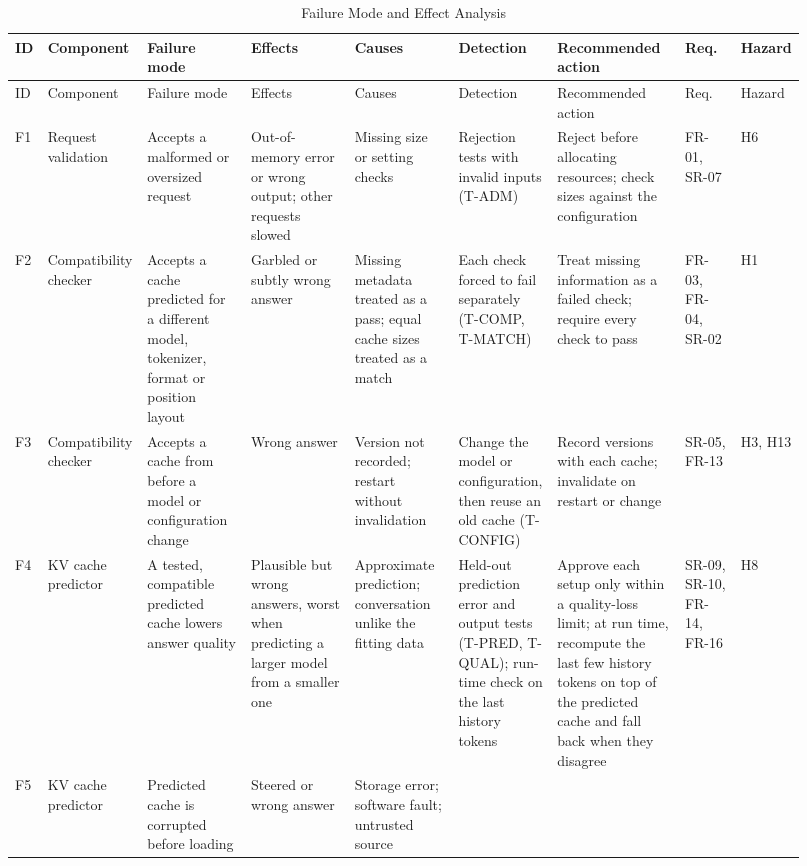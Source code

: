 \documentclass{article}
\begin{document}
\begin{landscape}
\footnotesize
\setlength{\tabcolsep}{3pt}
\begin{longtable}{@{}p{0.04\linewidth}p{0.10\linewidth}p{0.13\linewidth}%
p{0.13\linewidth}p{0.13\linewidth}p{0.11\linewidth}p{0.16\linewidth}%
p{0.07\linewidth}p{0.05\linewidth}@{}}
\caption{Failure Mode and Effect Analysis}\label{tab:fmea}\\
\toprule
ID & Component & Failure mode & Effects & Causes & Detection &
Recommended action & Req. & Hazard\\
\midrule\endfirsthead
\toprule
ID & Component & Failure mode & Effects & Causes & Detection &
Recommended action & Req. & Hazard\\
\midrule\endhead
F1 & Request validation & Accepts a malformed or oversized request &
Out-of-memory error or wrong output; other requests slowed & Missing size
or setting checks & Rejection tests with invalid inputs (T-ADM) & Reject
before allocating resources; check sizes against the configuration & FR-01,
SR-07 & H6\\
F2 & Compatibility checker & Accepts a cache predicted for a different
model, tokenizer, format or position layout & Garbled or subtly wrong
answer & Missing metadata treated as a pass; equal cache sizes treated as a
match & Each check forced to fail separately (T-COMP, T-MATCH) & Treat
missing information as a failed check; require every check to pass & FR-03,
FR-04, SR-02 & H1\\
F3 & Compatibility checker & Accepts a cache from before a model or
configuration change & Wrong answer & Version not recorded; restart without
invalidation & Change the model or configuration, then reuse an old cache
(T-CONFIG) & Record versions with each cache; invalidate on restart or
change & SR-05, FR-13 & H3, H13\\
F4 & KV cache predictor & A tested, compatible predicted cache lowers
answer quality & Plausible but wrong answers, worst when predicting a
larger model from a smaller one & Approximate prediction; conversation
unlike the fitting data & Held-out prediction error and output tests
(T-PRED, T-QUAL); run-time check on the last history tokens & Approve
each setup only within a quality-loss limit; at run time, recompute the
last few history tokens on top of the predicted cache and fall back when
they disagree & SR-09, SR-10, FR-14, FR-16 & H8\\
F5 & KV cache predictor & Predicted cache is corrupted before loading &
Steered or wrong answer & Storage error; software fault; untrusted source

\end{longtable}
\end{landscape}
\end{document}
